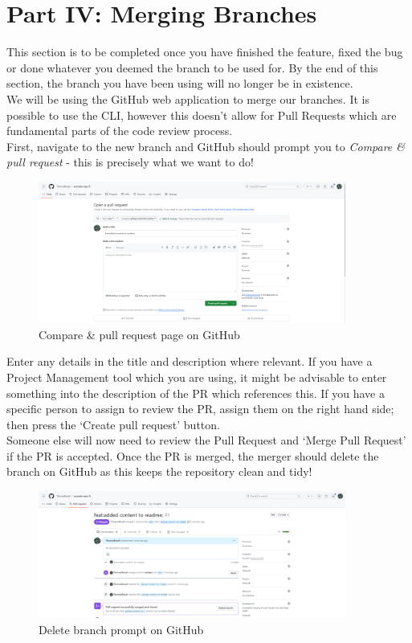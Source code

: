 \documentclass[a4paper, 11pt]{article}
\begin{document}
\section{Part IV: Merging Branches}
This section is to be completed once you have finished the feature, fixed the bug or done whatever you deemed the branch to be used for. By the end of this section, the branch you have been using will no longer be in existence.\\

We will be using the GitHub web application to merge our branches. It is possible to use the CLI, however this doesn't allow for Pull Requests which are fundamental parts of the code review process.\\

First, navigate to the new branch and GitHub should prompt you to \textit{Compare \& pull request} - this is precisely what we want to do!
\begin{figure}[H]
    \centering
    \includegraphics[width=0.9\textwidth]{assets/gh-compare-pr.png}
    \caption{Compare \& pull request page on GitHub}
\end{figure}

Enter any details in the title and description where relevant. If you have a Project Management tool which you are using, it might be advisable to enter something into the description of the PR which references this. If you have a specific person to assign to review the PR, assign them on the right hand side; then press the `Create pull request' button.\\

Someone else will now need to review the Pull Request and `Merge Pull Request' if the PR is accepted. Once the PR is merged, the merger should delete the branch on GitHub as this keeps the repository clean and tidy!
\begin{figure}[H]
    \centering
    \includegraphics[width=0.9\textwidth]{assets/gh-delete-branch.png}
    \caption{Delete branch prompt on GitHub}
\end{figure}
\end{document}
